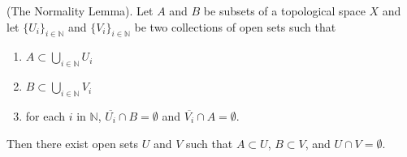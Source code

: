 \documentclass[a4paper,12pt,twoside]{hmcpset}
\begin{document}
\begin{problem}[Theorem 5.29] (The Normality Lemma). Let $A$ and $B$
    be subsets of a topological space $X$ and let $\{U_i\}_{i \in
    \mathbb{N}}$ and $\{V_i\}_{i \in \mathbb{N}}$ be two collections
    of open sets such that
    \begin{enumerate}
        \item $A \subset \bigcup\limits_{i \in \mathbb{N}} U_i$
        \item $B \subset \bigcup\limits_{i \in \mathbb{N}} V_i$\
        \item for each $i$ in $\mathbb{N}$, $\overline{U_i} \cap B =
        \emptyset$ and $\overline{V_i} \cap A = \emptyset$.
    \end{enumerate}
    Then there exist open sets $U$ and $V$ such that $A \subset U$, $B
    \subset V$, and $U \cap V = \emptyset$.
\end{problem}
\end{document}

